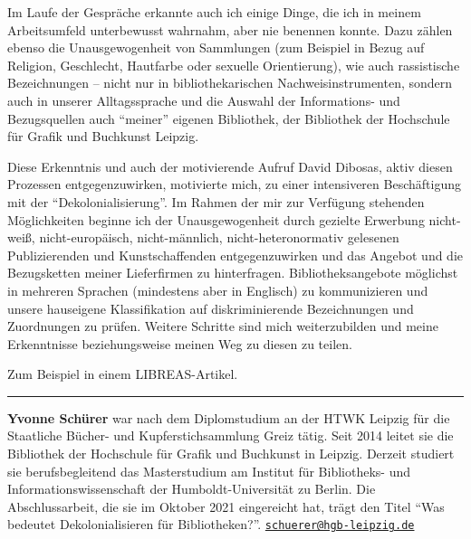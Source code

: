\documentclass[a4paper,
fontsize=11pt,
oneside,
numbers=noperiodatend,
parskip=half-,
bibliography=totoc,
final
]{scrartcl}
\begin{document}
Im Laufe der Gespräche erkannte auch ich einige Dinge, die ich in meinem
Arbeitsumfeld unterbewusst wahrnahm, aber nie benennen konnte. Dazu
zählen ebenso die Unausgewogenheit von Sammlungen (zum Beispiel in Bezug
auf Religion, Geschlecht, Hautfarbe oder sexuelle Orientierung), wie
auch rassistische Bezeichnungen -- nicht nur in bibliothekarischen
Nachweisinstrumenten, sondern auch in unserer Alltagssprache und die
Auswahl der Informations- und Bezugsquellen auch \enquote{meiner}
eigenen Bibliothek, der Bibliothek der Hochschule für Grafik und
Buchkunst Leipzig.

Diese Erkenntnis und auch der motivierende Aufruf David Dibosas, aktiv
diesen Prozessen entgegenzuwirken, motivierte mich, zu einer
intensiveren Beschäftigung mit der \enquote{Dekolonialisierung}. Im
Rahmen der mir zur Verfügung stehenden Möglichkeiten beginne ich der
Unausgewogenheit durch gezielte Erwerbung nicht-weiß, nicht-europäisch,
nicht-männlich, nicht-heteronormativ gelesenen Publizierenden und
Kunstschaffenden entgegenzuwirken und das Angebot und die Bezugsketten
meiner Lieferfirmen zu hinterfragen. Bibliotheksangebote möglichst in
mehreren Sprachen (mindestens aber in Englisch) zu kommunizieren und
unsere hauseigene Klassifikation auf diskriminierende Bezeichnungen und
Zuordnungen zu prüfen. Weitere Schritte sind mich weiterzubilden und
meine Erkenntnisse beziehungsweise meinen Weg zu diesen zu
teilen.

Zum Beispiel in einem LIBREAS-Artikel.

\begin{center}\rule{0.5\linewidth}{0.5pt}\end{center}

\textbf{Yvonne Schürer} war nach dem Diplomstudium an der HTWK Leipzig
für die Staatliche Bücher- und Kupferstichsammlung Greiz tätig. Seit
2014 leitet sie die Bibliothek der Hochschule für Grafik und Buchkunst
in Leipzig. Derzeit studiert sie berufsbegleitend das Masterstudium am
Institut für Bibliotheks- und Informationswissenschaft der
Humboldt-Universität zu Berlin. Die Abschlussarbeit, die sie im Oktober
2021 eingereicht hat, trägt den Titel \enquote{Was bedeutet Dekolonialisieren
für Bibliotheken?}. \href{mailto:schuerer@hgb-leipzig.de}{\nolinkurl{schuerer@hgb-leipzig.de}}
\end{document}
